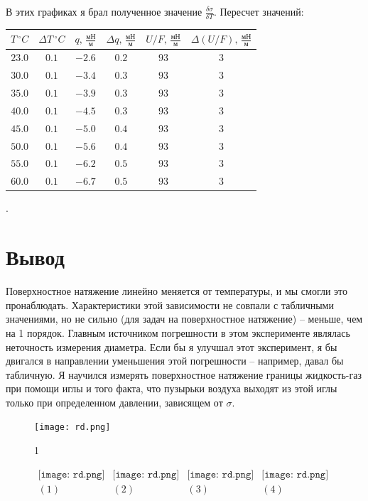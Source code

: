 В этих графиках я брал полученное значение $\frac{\delta \sigma}{\delta T}$. Пересчет значений:
\begin{center}
\begin{tabular}{|c|c|c|c|c|c|}
\hline
$T\,^\circ C$&$\Delta T\,^\circ C$&$q,\,\frac{\text{мН}}{\text{м}}$&$\Delta q,\,\frac{\text{мН}}{\text{м}}$&$U/F,\,\frac{\text{мН}}{\text{м}}$&$\Delta (U/F),\,\frac{\text{мН}}{\text{м}}$\\
\hline
$23.0$&$0.1$&$-2.6$&$0.2$&$93$&$3$\\ \hline
$30.0$&$0.1$&$-3.4$&$0.3$&$93$&$3$\\ \hline
$35.0$&$0.1$&$-3.9$&$0.3$&$93$&$3$\\ \hline
$40.0$&$0.1$&$-4.5$&$0.3$&$93$&$3$\\ \hline
$45.0$&$0.1$&$-5.0$&$0.4$&$93$&$3$\\ \hline
$50.0$&$0.1$&$-5.6$&$0.4$&$93$&$3$\\ \hline
$55.0$&$0.1$&$-6.2$&$0.5$&$93$&$3$\\ \hline
$60.0$&$0.1$&$-6.7$&$0.5$&$93$&$3$\\ \hline
\end{tabular}.
\end{center}

\section*{Вывод}
Поверхностное натяжение линейно меняется от температуры, и мы смогли это пронаблюдать. Характеристики этой зависимости не совпали с табличными значениями, но не сильно (для задач на поверхностное натяжение) -- меньше, чем на 1 порядок. Главным источником погрешности в этом эксперименте являлась неточность измерения диаметра. Если бы я улучшал этот эксперимент, я бы двигался в направлении уменьшения этой погрешности -- например, давал бы табличную. Я научился измерять поверхностное натяжение границы жидкость-газ при помощи иглы и того факта, что пузырьки воздуха выходят из этой иглы только при определенном давлении, зависящем от $\sigma$.









\lipsum[1-4]
\begin{figure}
\centering
\texttt{[image: rd.png]}
\caption{1}
\end{figure}
\lipsum[1-6]


\begin{figure}[h]
\begin{center}$
\begin{array}{cccc}
\texttt{[image: rd.png]}&
\texttt{[image: rd.png]}&
\texttt{[image: rd.png]}&
\texttt{[image: rd.png]}\\
(1) & (2) & (3) & (4)
\end{array}$
\end{center}
\end{figure}